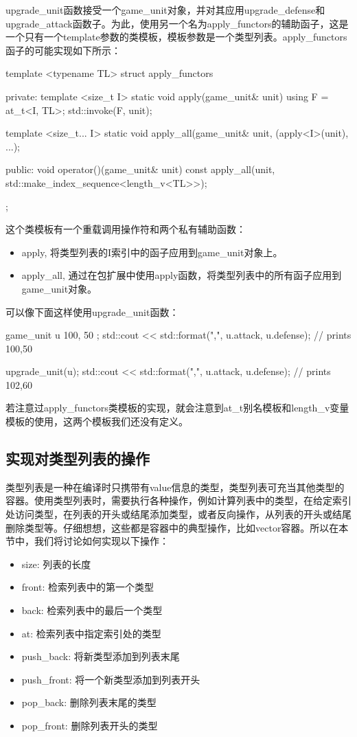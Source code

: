 upgrade_unit函数接受一个game_unit对象，并对其应用upgrade_defense和upgrade_attack函数子。为此，使用另一个名为apply_functors的辅助函子，这是一个只有一个template参数的类模板，模板参数是一个类型列表。apply_functors函子的可能实现如下所示：

\begin{cppcode}
template <typename TL>
struct apply_functors
{
private:
	template <size_t I>
	static void apply(game_unit& unit)
	{
		using F = at_t<I, TL>;
		std::invoke(F{}, unit);
	}

	template <size_t... I>
	static void apply_all(game_unit& unit,
	{
		(apply<I>(unit), ...);
	}

public:
	void operator()(game_unit& unit) const
	{
		apply_all(unit,
		std::make_index_sequence<length_v<TL>>{});
	}
};
\end{cppcode}

这个类模板有一个重载调用操作符和两个私有辅助函数：

\begin{itemize}
  \item apply, 将类型列表的I索引中的函子应用到game_unit对象上。
  \item apply_all, 通过在包扩展中使用apply函数，将类型列表中的所有函子应用到game_unit对象。
\end{itemize}

可以像下面这样使用upgrade_unit函数：

\begin{cppcode}
game_unit u{ 100, 50 };
std::cout << std::format("{},{}\n", u.attack, u.defense);
// prints 100,50

upgrade_unit(u);
std::cout << std::format("{},{}\n", u.attack, u.defense);
// prints 102,60
\end{cppcode}

若注意过apply_functors类模板的实现，就会注意到at_t别名模板和length_v变量模板的使用，这两个模板我们还没有定义。

\subsection{实现对类型列表的操作}

类型列表是一种在编译时只携带有value信息的类型，类型列表可充当其他类型的容器。使用类型列表时，需要执行各种操作，例如计算列表中的类型，在给定索引处访问类型，在列表的开头或结尾添加类型，或者反向操作，从列表的开头或结尾删除类型等。仔细想想，这些都是容器中的典型操作，比如vector容器。所以在本节中，我们将讨论如何实现以下操作：

\begin{itemize}
  \item size: 列表的长度
  \item front: 检索列表中的第一个类型
  \item back: 检索列表中的最后一个类型
  \item at: 检索列表中指定索引处的类型
  \item push_back: 将新类型添加到列表末尾
  \item push_front: 将一个新类型添加到列表开头
  \item pop_back: 删除列表末尾的类型
  \item pop_front: 删除列表开头的类型
\end{itemize}

